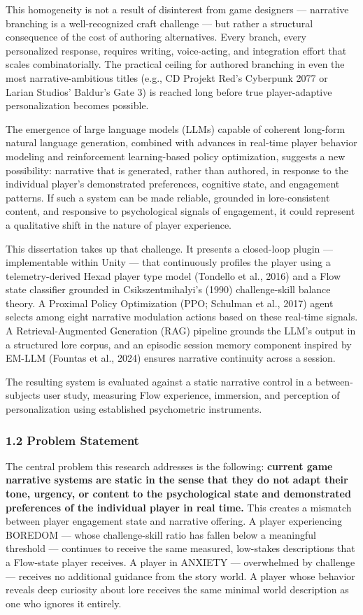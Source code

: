This homogeneity is not a result of disinterest from game designers ---
narrative branching is a well-recognized craft challenge --- but rather
a structural consequence of the cost of authoring alternatives. Every
branch, every personalized response, requires writing, voice-acting, and
integration effort that scales combinatorially. The practical ceiling
for authored branching in even the most narrative-ambitious titles
(e.g., CD Projekt Red's Cyberpunk 2077 or Larian Studios' Baldur's Gate
3) is reached long before true player-adaptive personalization becomes
possible.

The emergence of large language models (LLMs) capable of coherent
long-form natural language generation, combined with advances in
real-time player behavior modeling and reinforcement learning-based
policy optimization, suggests a new possibility: narrative that is
generated, rather than authored, in response to the individual player's
demonstrated preferences, cognitive state, and engagement patterns. If
such a system can be made reliable, grounded in lore-consistent content,
and responsive to psychological signals of engagement, it could
represent a qualitative shift in the nature of player experience.

This dissertation takes up that challenge. It presents a closed-loop
plugin --- implementable within Unity --- that continuously profiles the
player using a telemetry-derived Hexad player type model (Tondello et
al., 2016) and a Flow state classifier grounded in Csikszentmihalyi's
(1990) challenge-skill balance theory. A Proximal Policy Optimization
(PPO; Schulman et al., 2017) agent selects among eight narrative
modulation actions based on these real-time signals. A
Retrieval-Augmented Generation (RAG) pipeline grounds the LLM's output
in a structured lore corpus, and an episodic session memory component
inspired by EM-LLM (Fountas et al., 2024) ensures narrative continuity
across a session.

The resulting system is evaluated against a static narrative control in
a between-subjects user study, measuring Flow experience, immersion, and
perception of personalization using established psychometric
instruments.

\subsubsection{1.2 Problem Statement}\label{problem-statement}

The central problem this research addresses is the following:
\textbf{current game narrative systems are static in the sense that they
do not adapt their tone, urgency, or content to the psychological state
and demonstrated preferences of the individual player in real time.}
This creates a mismatch between player engagement state and narrative
offering. A player experiencing BOREDOM --- whose challenge-skill ratio
has fallen below a meaningful threshold --- continues to receive the
same measured, low-stakes descriptions that a Flow-state player
receives. A player in ANXIETY --- overwhelmed by challenge --- receives
no additional guidance from the story world. A player whose behavior
reveals deep curiosity about lore receives the same minimal world
description as one who ignores it entirely.

